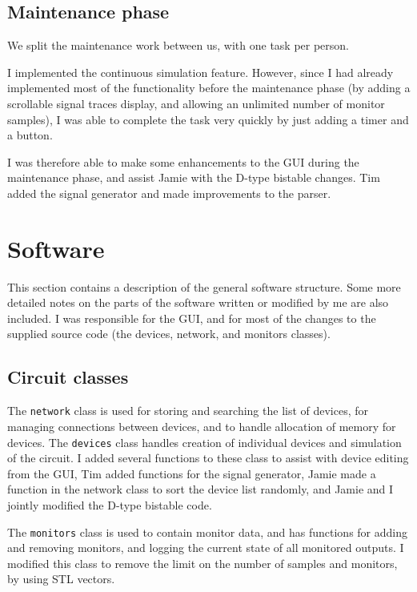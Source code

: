 \documentclass[a4paper,10pt]{article}
\begin{document}
\subsection{Maintenance phase}
We split the maintenance work between us, with one task per person.

I implemented the continuous simulation feature. However, since I had already implemented most of the functionality before the maintenance phase (by adding a scrollable signal traces display, and allowing an unlimited number of monitor samples), I was able to complete the task very quickly by just adding a timer and a button. 

I was therefore able to make some enhancements to the GUI during the maintenance phase, and assist Jamie with the D-type bistable changes. Tim added the signal generator and made improvements to the parser. 

\section{Software}
This section contains a description of the general software structure. Some more detailed notes on the parts of the software written or modified by me are also included. I was responsible for the GUI, and for most of the changes to the supplied source code (the devices, network, and monitors classes). 

\subsection{Circuit classes}
The \texttt{network} class is used for storing and searching the list of devices, for managing connections between devices, and to handle allocation of memory for devices. The \texttt{devices} class handles creation of individual devices and simulation of the circuit. I added several functions to these class to assist with device editing from the GUI, Tim added functions for the signal generator, Jamie made a function in the network class to sort the device list randomly, and Jamie and I jointly modified the D-type bistable code. 

The \texttt{monitors} class is used to contain monitor data, and has functions for adding and removing monitors, and logging the current state of all monitored outputs. I modified this class to remove the limit on the number of samples and monitors, by using STL vectors. 
\end{document}
